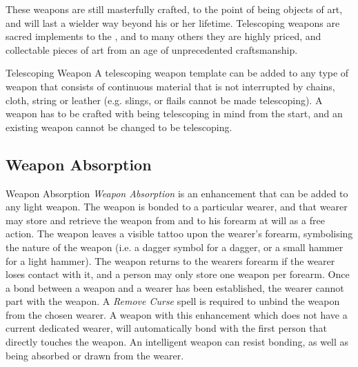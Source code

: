 These weapons are still masterfully crafted, to the point of being objects of
art, and will last a wielder way beyond his or her lifetime. Telescoping
weapons are sacred implements to the , and to many
others they are highly priced, and collectable pieces of art from an age of
unprecedented craftsmanship.

\begin{35e}{Telescoping Weapon}
  A telescoping weapon template can be added to any type of weapon that consists
  of continuous material that is not interrupted by chains, cloth, string or
  leather (e.g. slings, or flails cannot be made telescoping). A weapon has to
  be crafted with being telescoping in mind from the start, and an existing
  weapon cannot be changed to be telescoping.

\end{35e}

\subsection{Weapon Absorption}
\label{sec:Weapon Absorption}

\begin{35e}{Weapon Absorption}
  \emph{Weapon Absorption} is an enhancement that can be added to any light
  weapon. The weapon is bonded to a particular wearer, and that wearer may
  store and retrieve the weapon from and to his forearm at will as a free
  action. The weapon leaves a visible tattoo upon the wearer's forearm,
  symbolising the nature of the weapon (i.e. a dagger symbol for a dagger, or
  a small hammer for a light hammer). The weapon returns to the wearers
  forearm if the wearer loses contact with it, and a person may only store one
  weapon per forearm. Once a bond between a weapon and a wearer has been
  established, the wearer cannot part with the weapon. A \emph{Remove Curse}
  spell is required to unbind the weapon from the chosen wearer. A weapon
  with this enhancement which does not have a current dedicated wearer, will
  automatically bond with the first person that directly touches the weapon.
  An intelligent weapon can resist bonding, as well as being absorbed or drawn
  from the wearer.
\end{35e}
